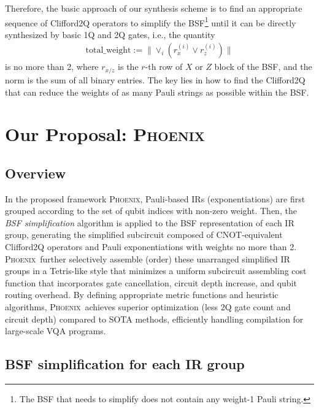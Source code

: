 \documentclass[conference,9pt]{IEEEtran}
\newcommand{\phoenix}{\textsc{Phoenix}}
\newcommand{\CNOT}{\mathrm{CNOT}}
\newcommand{\totalWeight}{\mathrm{total\_weight}}
\begin{document}
    Therefore, the basic approach of our synthesis scheme is to find an appropriate sequence of Clifford2Q operators to simplify the BSF\footnote{The BSF that needs to simplify does not contain any weight-1 Pauli string. } until it can be directly synthesized by basic 1Q and 2Q gates, i.e., the quantity
    \begin{align}
        \totalWeight := \lVert  \lor_i (r_x^{(i)}\lor r_z^{(i)})  \rVert
    \end{align}
    is no more than 2, where $r_{x/z}$ is the $r$-th row of $X$ or $Z$ block of the BSF, and the norm is the sum of all binary entries. The key lies in how to find the Clifford2Q that can reduce the weights of as many Pauli strings as possible within the BSF.




\section{Our Proposal: \phoenix}



\subsection{Overview}

    In the proposed framework \phoenix, Pauli-based IRs (exponentiations) are first grouped according to the set of qubit indices with non-zero weight. Then, the \emph{BSF simplification} algorithm is applied to the BSF representation of each IR group, generating the simplified subcircuit composed of $ \CNOT $-equivalent Clifford2Q operators and Pauli exponentiations with weights no more than 2. \phoenix\ further selectively assemble (order) these unarranged simplified IR groups in a Tetris-like style that minimizes a uniform subcircuit assembling cost function that incorporates gate cancellation, circuit depth increase, and qubit routing overhead. By defining appropriate metric functions and heuristic algorithms, \phoenix\ achieves superior optimization (less 2Q gate count and circuit depth) compared to SOTA methods, efficiently handling compilation for large-scale VQA programs. %



\subsection{BSF simplification for each IR group}
\end{document}
